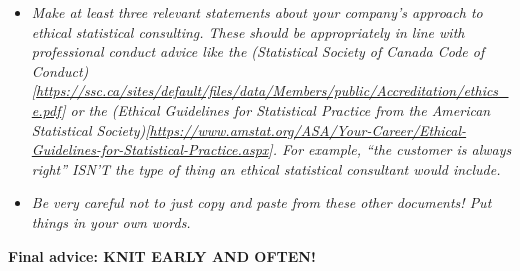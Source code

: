 \documentclass[
          english,
          paper=a4,
              ,captions=tableheading
  ]{scrartcl}
\providecommand{\tightlist}{%
        \setlength{\itemsep}{0pt}\setlength{\parskip}{0pt}}
\begin{document}
\begin{itemize}
\tightlist
\item
  \emph{Make at least three relevant statements about your company's
  approach to ethical statistical consulting. These should be
  appropriately in line with professional conduct advice like the
  (Statistical Society of Canada Code of
  Conduct){[}\url{https://ssc.ca/sites/default/files/data/Members/public/Accreditation/ethics_e.pdf}{]}
  or the (Ethical Guidelines for Statistical Practice from the American
  Statistical
  Society){[}\url{https://www.amstat.org/ASA/Your-Career/Ethical-Guidelines-for-Statistical-Practice.aspx}{]}.
  For example, \enquote{the customer is always right} ISN'T the type of
  thing an ethical statistical consultant would include.}
\item
  \emph{Be very careful not to just copy and paste from these other
  documents! Put things in your own words.}
\end{itemize}

\textbf{Final advice: KNIT EARLY AND OFTEN!}
\end{document}
